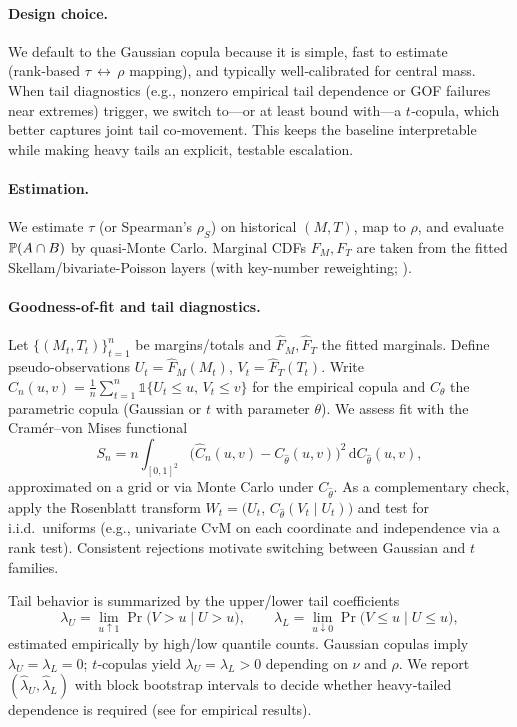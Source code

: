 \paragraph{Design choice.} We default to the Gaussian copula because it is simple, fast to estimate (rank‑based $\tau\,\leftrightarrow\,\rho$ mapping), and typically well‑calibrated for central mass. When tail diagnostics (e.g., nonzero empirical tail dependence or GOF failures near extremes) trigger, we switch to---or at least bound with---a $t$‑copula, which better captures joint tail co‑movement. This keeps the baseline interpretable while making heavy tails an explicit, testable escalation.

\paragraph{Estimation.} We estimate $\tau$ (or Spearman’s $\rho_S$) on historical $(M,T)$, map to $\rho$, and evaluate $\mathbb{P}(A\cap B)$ by quasi-Monte Carlo. Marginal CDFs $F_M,F_T$ are taken from the fitted Skellam/bivariate-Poisson layers (with key-number reweighting; ).

\paragraph{Goodness-of-fit and tail diagnostics.}\label{subsec:copula-gof}
Let $\{(M_t,T_t)\}_{t=1}^n$ be margins/totals and $\hat F_M,\hat F_T$ the fitted marginals. Define pseudo-observations $U_t=\hat F_M(M_t)$, $V_t=\hat F_T(T_t)$. Write $\hat C_n(u,v)=\tfrac1n\sum_{t=1}^n \mathbb{1}\{U_t\le u,\,V_t\le v\}$ for the empirical copula and $C_\theta$ the parametric copula (Gaussian or $t$ with parameter $\theta$).
We assess fit with the Cramér–von Mises functional
\[
S_n= n\int_{[0,1]^2}\big(\hat C_n(u,v)-C_{\hat\theta}(u,v)\big)^2\,\mathrm d C_{\hat\theta}(u,v),
\]
approximated on a grid or via Monte Carlo under $C_{\hat\theta}$. As a complementary check, apply the Rosenblatt transform $W_t=\big(U_t,\, C_{\hat\theta}(V_t\mid U_t)\big)$ and test for i.i.d.\ uniforms (e.g., univariate CvM on each coordinate and independence via a rank test). Consistent rejections motivate switching between Gaussian and $t$ families.

Tail behavior is summarized by the upper/lower tail coefficients
\[
\lambda_U=\lim_{u\uparrow 1}\Pr\big(V>u\mid U>u\big),\qquad
\lambda_L=\lim_{u\downarrow 0}\Pr\big(V\le u\mid U\le u\big),
\]
estimated empirically by high/low quantile counts. Gaussian copulas imply $\lambda_U=\lambda_L=0$; $t$‑copulas yield $\lambda_U=\lambda_L>0$ depending on $\nu$ and $\rho$. We report $(\hat\lambda_U,\hat\lambda_L)$ with block bootstrap intervals to decide whether heavy‑tailed dependence is required (see  for empirical results).


